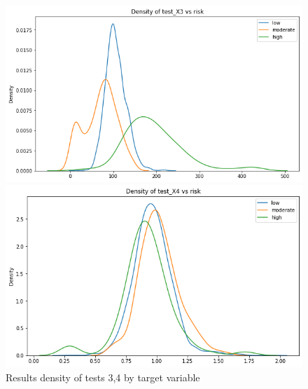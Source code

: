 \documentclass[a4paper]{article}
\begin{document}
\begin{figure}[h]
\begin{minipage}[b]{0.45\linewidth}
\centering
\includegraphics[width=\textwidth]{Materials//Density Plots/test3.png}
\end{minipage}
\hspace{0.25cm}
\begin{minipage}[b]{0.45\linewidth}
\centering
\includegraphics[width=\textwidth]{Materials//Density Plots/test4.png}
\end{minipage}
\caption{Results density of tests 3,4 by target variable}
\label{fig: Density results tests 3,4}
\end{figure}
\end{document}
